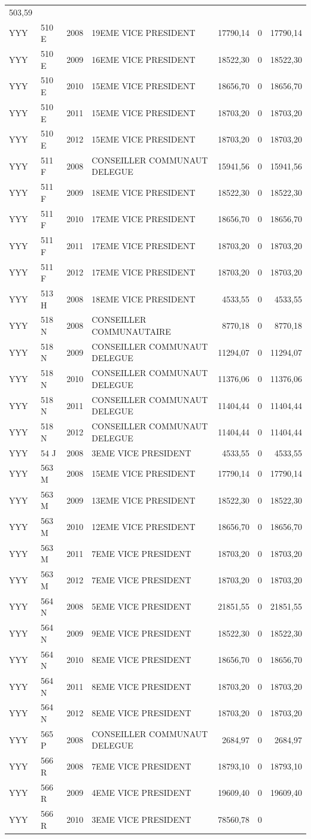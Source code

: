 \begin{longtable}[]{@{}llrlrrr@{}}
503,59\tabularnewline
YYY & 510 E & 2008 & 19EME VICE PRESIDENT & 17790,14 & 0 &
17790,14\tabularnewline
YYY & 510 E & 2009 & 16EME VICE PRESIDENT & 18522,30 & 0 &
18522,30\tabularnewline
YYY & 510 E & 2010 & 15EME VICE PRESIDENT & 18656,70 & 0 &
18656,70\tabularnewline
YYY & 510 E & 2011 & 15EME VICE PRESIDENT & 18703,20 & 0 &
18703,20\tabularnewline
YYY & 510 E & 2012 & 15EME VICE PRESIDENT & 18703,20 & 0 &
18703,20\tabularnewline
YYY & 511 F & 2008 & CONSEILLER COMMUNAUT DELEGUE & 15941,56 & 0 &
15941,56\tabularnewline
YYY & 511 F & 2009 & 18EME VICE PRESIDENT & 18522,30 & 0 &
18522,30\tabularnewline
YYY & 511 F & 2010 & 17EME VICE PRESIDENT & 18656,70 & 0 &
18656,70\tabularnewline
YYY & 511 F & 2011 & 17EME VICE PRESIDENT & 18703,20 & 0 &
18703,20\tabularnewline
YYY & 511 F & 2012 & 17EME VICE PRESIDENT & 18703,20 & 0 &
18703,20\tabularnewline
YYY & 513 H & 2008 & 18EME VICE PRESIDENT & 4533,55 & 0 &
4533,55\tabularnewline
YYY & 518 N & 2008 & CONSEILLER COMMUNAUTAIRE & 8770,18 & 0 &
8770,18\tabularnewline
YYY & 518 N & 2009 & CONSEILLER COMMUNAUT DELEGUE & 11294,07 & 0 &
11294,07\tabularnewline
YYY & 518 N & 2010 & CONSEILLER COMMUNAUT DELEGUE & 11376,06 & 0 &
11376,06\tabularnewline
YYY & 518 N & 2011 & CONSEILLER COMMUNAUT DELEGUE & 11404,44 & 0 &
11404,44\tabularnewline
YYY & 518 N & 2012 & CONSEILLER COMMUNAUT DELEGUE & 11404,44 & 0 &
11404,44\tabularnewline
YYY & 54 J & 2008 & 3EME VICE PRESIDENT & 4533,55 & 0 &
4533,55\tabularnewline
YYY & 563 M & 2008 & 15EME VICE PRESIDENT & 17790,14 & 0 &
17790,14\tabularnewline
YYY & 563 M & 2009 & 13EME VICE PRESIDENT & 18522,30 & 0 &
18522,30\tabularnewline
YYY & 563 M & 2010 & 12EME VICE PRESIDENT & 18656,70 & 0 &
18656,70\tabularnewline
YYY & 563 M & 2011 & 7EME VICE PRESIDENT & 18703,20 & 0 &
18703,20\tabularnewline
YYY & 563 M & 2012 & 7EME VICE PRESIDENT & 18703,20 & 0 &
18703,20\tabularnewline
YYY & 564 N & 2008 & 5EME VICE PRESIDENT & 21851,55 & 0 &
21851,55\tabularnewline
YYY & 564 N & 2009 & 9EME VICE PRESIDENT & 18522,30 & 0 &
18522,30\tabularnewline
YYY & 564 N & 2010 & 8EME VICE PRESIDENT & 18656,70 & 0 &
18656,70\tabularnewline
YYY & 564 N & 2011 & 8EME VICE PRESIDENT & 18703,20 & 0 &
18703,20\tabularnewline
YYY & 564 N & 2012 & 8EME VICE PRESIDENT & 18703,20 & 0 &
18703,20\tabularnewline
YYY & 565 P & 2008 & CONSEILLER COMMUNAUT DELEGUE & 2684,97 & 0 &
2684,97\tabularnewline
YYY & 566 R & 2008 & 7EME VICE PRESIDENT & 18793,10 & 0 &
18793,10\tabularnewline
YYY & 566 R & 2009 & 4EME VICE PRESIDENT & 19609,40 & 0 &
19609,40\tabularnewline
YYY & 566 R & 2010 & 3EME VICE PRESIDENT & 78560,78 & 0 &

\end{longtable}

